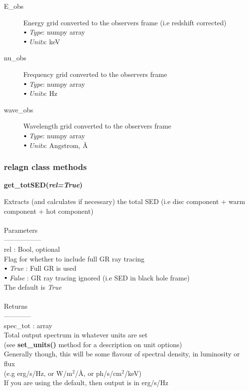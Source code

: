\documentclass[a4paper, 11pt, times, onecolumn]{article}
\newcommand{\sbt}{\,\begin{picture}(-1,1)(-1,-3)\circle*{3}\end{picture}\ }
\begin{document}
\begin{description}
	\item[E\_obs] Energy grid converted to the observers frame (i.e redshift corrected) \\
		$\sbt$ {\it Type}: numpy array \\
		$\sbt$ {\it Units}: keV
	
	\item[nu\_obs] Frequency grid converted to the observers frame \\
		$\sbt$ {\it Type}: numpy array \\
		$\sbt$ {\it Units}: Hz
	
	\item[wave\_obs] Wavelength grid converted to the observers frame \\
		$\sbt$ {\it Type}: numpy array \\
		$\sbt$ {\it Units}: Angstrom, \AA
	
\end{description}


\subsubsection{{\sc relagn} class methods}

\noindent
{\bf get\_totSED(\textit{rel=True})}
\begin{adjustwidth}{1.5cm}{}

	\noindent
	Extracts (and calculates if necessary) the total SED (i.e disc component + warm component + hot component)
	\\~\\
	Parameters\\
	-----------------\\
	\indent rel : Bool, optional \\
	\indent \indent Flag for whether to include full GR ray tracing \\
	\indent \indent \indent $\sbt$ {\it True} : Full GR is used \\
	\indent \indent \indent $\sbt$ {\it False} : GR ray tracing ignored (i.e SED in black hole frame) \\
	\indent \indent The default is {\it True}
	\\~\\
	Returns \\
	------------\\ 
	\indent spec\_tot : array \\
	\indent \indent Total output spectrum in whatever units are set \\
	\indent \indent (see {\bf set\_units()} method for a description on unit options) \\
	\indent \indent Generally though, this will be some flavour of spectral density, in luminosity or flux \\
	\indent \indent  (e.g erg/s/Hz, or W/m$^{2}$/\AA,  or ph/s/cm$^{2}$/keV) \\
	\indent \indent If you are using the default, then output is in erg/s/Hz
	
\end{adjustwidth}
\end{document}
